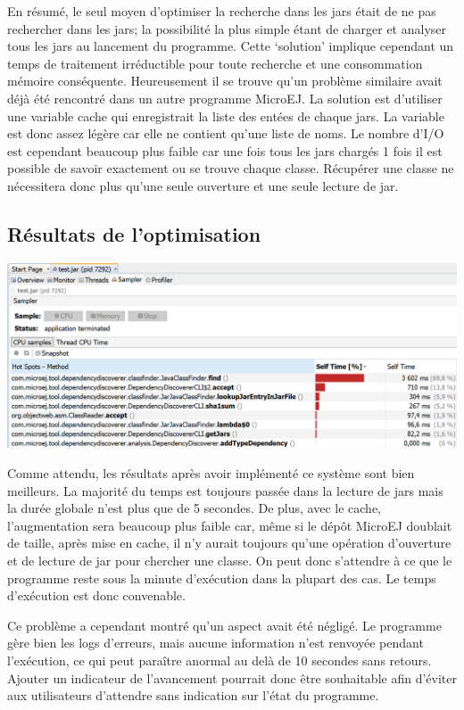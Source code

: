 \documentclass[french,a4paper,12pt]{report}
\begin{document}
En résumé, le seul moyen d’optimiser la recherche dans les jars était de ne pas rechercher dans les jars; la possibilité la plus simple étant de charger et analyser tous les jars au lancement du programme. Cette ‘solution’ implique cependant un temps de traitement irréductible pour toute recherche et une consommation mémoire conséquente. Heureusement il se trouve qu’un problème similaire avait déjà été rencontré dans un autre programme MicroEJ. La solution est d'utiliser une variable cache qui enregistrait la liste des entées de chaque jars. La variable est donc assez légère car elle ne contient qu’une liste de noms. Le nombre d’I/O est cependant beaucoup plus faible car une fois tous les jars chargés 1 fois il est possible de savoir exactement ou se trouve chaque classe. Récupérer une classe ne nécessitera donc plus qu’une seule ouverture et une seule lecture de jar.

\subsection{Résultats de l’optimisation}

\begin{center}
\includegraphics[width=\textwidth]{./ressources/images/timeRepartitionByMethodsCachedsheer.png}
\end{center}

Comme attendu, les résultats après avoir implémenté ce système sont bien meilleurs.
La majorité du temps est toujours passée dans la lecture de jars mais la durée globale n’est plus que de 5 secondes. De plus, avec le cache, l’augmentation sera beaucoup plus faible car, même si le dépôt MicroEJ doublait de taille, après mise en cache, il n’y aurait toujours qu’une opération d’ouverture et de lecture de jar pour chercher une classe. On peut donc s’attendre à ce que le programme reste sous la minute d’exécution dans la plupart des cas. Le temps d’exécution est donc convenable.

Ce problème a cependant montré qu'un aspect avait été négligé. Le programme gère bien les logs d’erreurs, mais aucune information n’est renvoyée pendant l’exécution, ce qui peut paraître anormal au delà de 10 secondes sans retours. Ajouter un indicateur de l’avancement pourrait donc être souhaitable afin d’éviter aux utilisateurs d’attendre sans indication sur l’état du programme.
\end{document}
